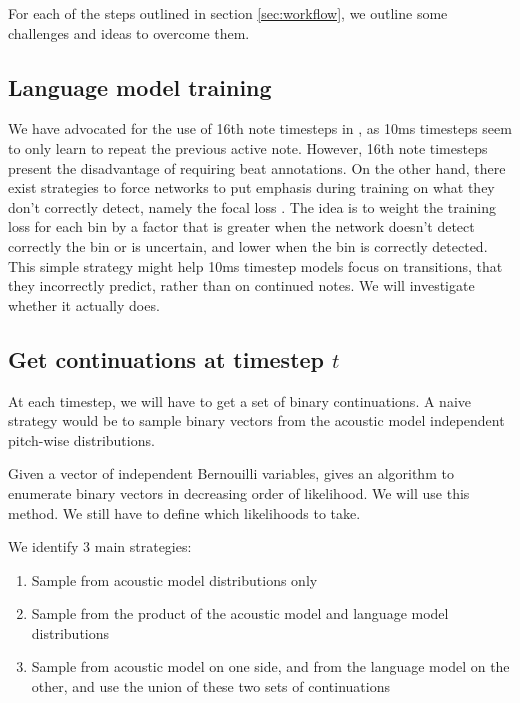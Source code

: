 \documentclass{article}
\begin{document}
For each of the steps outlined in section \ref{sec:workflow}, we outline some challenges and ideas to overcome them.

\subsection{Language model training}
\label{sec:focalloss}

We have advocated for the use of 16th note timesteps in \cite{Ycart2017}, as 10ms timesteps seem to only learn to repeat the previous active note.
However, 16th note timesteps present the disadvantage of requiring beat annotations.
On the other hand, there exist strategies to force networks to put emphasis during training on what they don't correctly detect, namely the focal loss \cite{lin2018focal}.
The idea is to weight the training loss for each bin by a factor that is greater when the network doesn't detect correctly the bin or is uncertain, and lower when the bin is correctly detected.
This simple strategy might help 10ms timestep models focus on transitions, that they incorrectly predict, rather than on continued notes.
We will investigate whether it actually does.

\subsection{Get continuations at timestep $t$}
\label{sec:sampling}

At each timestep, we will have to get a set of binary continuations.
A naive strategy would be to sample binary vectors from the acoustic model independent pitch-wise distributions.

Given a vector of independent Bernouilli variables, \cite{Boulanger-Lewandowski2013} gives an algorithm to enumerate binary vectors in decreasing order of likelihood.
We will use this method.
We still have to define which likelihoods to take.

We identify 3 main strategies:

\begin{enumerate}
\item Sample from acoustic model distributions only
\item Sample from the product of the acoustic model and language model distributions
\item Sample from acoustic model on one side, and from the language model on the other, and use the union of these two sets of continuations
\end{enumerate}
\end{document}
